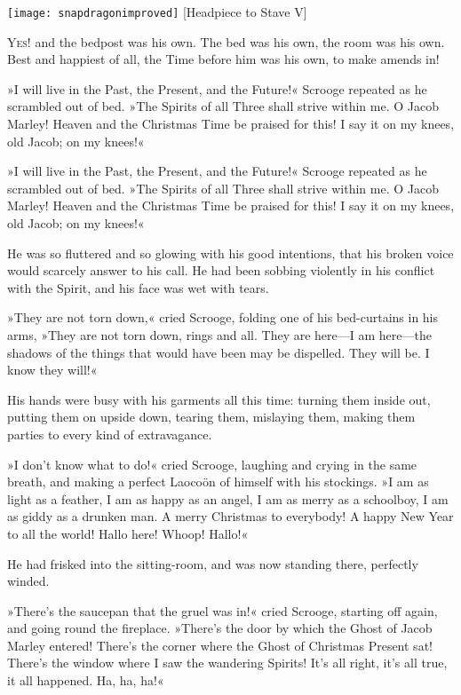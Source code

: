 \begin{minipage}[c]{\textwidth}
\texttt{[image: snapdragonimproved]}
[Headpiece to Stave V]{}
\end{minipage}

\lettrine[lines=4]{Y}{es!} and the bedpost was his own. The bed was his own, the room was his own. Best and happiest of all, the Time before him was his own, to make amends in!

\zz
»I will live in the Past, the Present, and the Future!« Scrooge repeated as he scrambled out of bed. »The Spirits of all Three shall strive within me. O Jacob Marley! Heaven and the Christmas Time be praised for this! I say it on my knees, old Jacob; on my knees!«


»I will live in the Past, the Present, and the Future!« Scrooge repeated as he scrambled out of bed. »The Spirits of all Three shall strive within me. O Jacob Marley! Heaven and the Christmas Time be praised for this! I say it on my knees, old Jacob; on my knees!«

He was so fluttered and so glowing with his good intentions, that his broken voice would scarcely answer to his call. He had been sobbing violently in his conflict with the Spirit, and his face was wet with tears.

»They are not torn down,« cried Scrooge, folding one of his bed-curtains in his arms, »They are not torn down, rings and all. They are here---I am here---the shadows of the things that would have been may be dispelled. They will be. I know they will!«

His hands were busy with his garments all this time: turning them inside out, putting them on upside down, tearing them, mislaying them, making them parties to every kind of extravagance.

»I don't know what to do!« cried Scrooge, laughing and crying in the same breath, and making a perfect Laoco\"on of himself with his stockings. »I am as light as a feather, I am as happy as an angel, I am as merry as a schoolboy, I am as giddy as a drunken man. A merry Christmas to everybody! A happy New Year to all the world! Hallo here! Whoop! Hallo!«

He had frisked into the sitting-room, and was now standing there, perfectly winded.

»There's the saucepan that the gruel was in!« cried Scrooge, starting off again, and going round the fireplace. »There's the door by which the Ghost of Jacob Marley entered! There's the corner where the Ghost of Christmas Present sat! There's the window where I saw the wandering Spirits! It's all right, it's all true, it all happened. Ha, ha, ha!«

